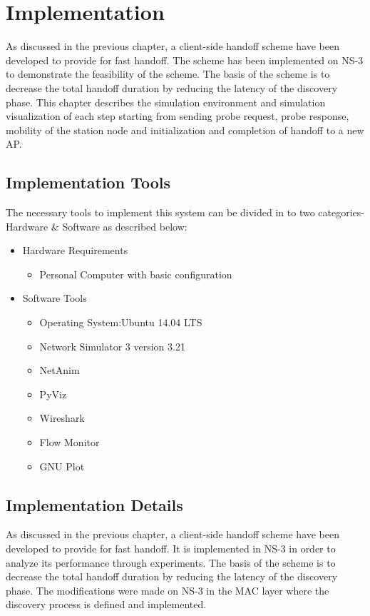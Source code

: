 \documentclass[12pt,a4paper]{report}
\begin{document}
\chapter{Implementation}
As discussed in the previous chapter, a client-side handoff scheme have been developed to provide for fast handoff. The scheme has been
implemented on NS-3 to demonstrate the feasibility of the scheme. The basis of the scheme is to decrease the total handoff duration by reducing the latency of the discovery phase. This chapter describes the simulation environment and simulation visualization of each step starting from sending probe request, probe response, mobility of the station node and initialization and completion of handoff to a new AP.

\section{Implementation Tools}
The necessary tools to implement this system can be divided in to two categories-Hardware \& Software as described below:
\begin{itemize}
\item 
Hardware Requirements
\begin{itemize}
\item 
Personal Computer with basic configuration
\end{itemize}
\item 
Software Tools
\begin{itemize}
\item 
Operating System:Ubuntu 14.04 LTS
\item 
Network Simulator 3 version 3.21
\item 
NetAnim
\item 
PyViz
\item 
Wireshark
\item 
Flow Monitor
\item 
GNU Plot
\end{itemize}
\end{itemize}
\section{Implementation Details}
As discussed in the previous chapter, a client-side handoff scheme have been developed to provide for fast handoff. It is implemented in NS-3 in order to analyze its performance through experiments. The basis of the scheme is to decrease the total handoff duration by reducing the latency of the discovery phase. The modifications were made on NS-3 in the MAC layer where the discovery process is defined and implemented.
\end{document}

